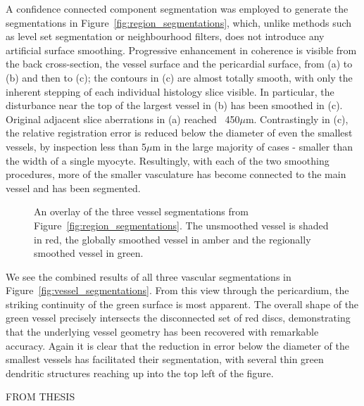        A confidence connected component segmentation was employed to generate the segmentations in Figure~\ref{fig:region_segmentations}, which, unlike methods such as level set segmentation or neighbourhood filters, does not introduce any artificial surface smoothing. Progressive enhancement in coherence is visible from the back cross-section, the vessel surface and the pericardial surface, from (a) to (b) and then to (c); the contours in (c) are almost totally smooth, with only the inherent stepping of each individual histology slice visible. In particular, the disturbance near the top of the largest vessel in (b) has been smoothed in (c). Original adjacent slice aberrations in (a) reached ~450$\mu$m. Contrastingly in (c), the relative registration error is reduced below the diameter of even the smallest vessels, by inspection less than 5$\mu$m in the large majority of cases - smaller than the width of a single myocyte. Resultingly, with each of the two smoothing procedures, more of the smaller vasculature has become connected to the main vessel and has been segmented.
    
      \begin{figure}[p]
        \caption{An overlay of the three vessel segmentations from Figure~\ref{fig:region_segmentations}. The unsmoothed vessel is shaded in red, the globally smoothed vessel in amber and the regionally smoothed vessel in green. }
      \end{figure}
    
      We see the combined results of all three vascular segmentations in Figure~\ref{fig:vessel_segmentations}. From this view through the pericardium, the striking continuity of the green surface is most apparent. The overall shape of the green vessel precisely intersects the disconnected set of red discs, demonstrating that the underlying vessel geometry has been recovered with remarkable accuracy. Again it is clear that the reduction in error below the diameter of the smallest vessels has facilitated their segmentation, with several thin green dendritic structures reaching up into the top left of the figure.
    
  
  FROM THESIS

  
  \begin{figure}[!t]
    \centering
    \\
    \\
    \caption{}
    \label{fig:}
  \end{figure}
  
